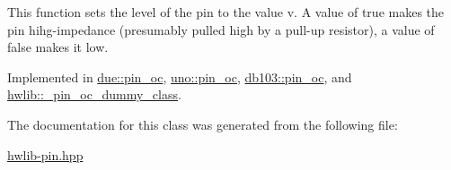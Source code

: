 This function sets the level of the pin to the value v. A value of true makes the pin hihg-\/impedance (presumably pulled high by a pull-\/up resistor), a value of false makes it low. 

Implemented in \hyperlink{classdue_1_1pin__oc_acfeab83375e9620804e87d695d3ea3b4}{due\+::pin\+\_\+oc}, \hyperlink{classuno_1_1pin__oc_a4f3191e577d13dab583d5fe86a9d960e}{uno\+::pin\+\_\+oc}, \hyperlink{classdb103_1_1pin__oc_afce9e329b087308a33ae30dbd701b08a}{db103\+::pin\+\_\+oc}, and \hyperlink{classhwlib_1_1__pin__oc__dummy__class_a10db7f81b4ed0dc0573f039d97c1d69e}{hwlib\+::\+\_\+pin\+\_\+oc\+\_\+dummy\+\_\+class}.



The documentation for this class was generated from the following file\+:\begin{DoxyCompactItemize}
\item 
\hyperlink{hwlib-pin_8hpp}{hwlib-\/pin.\+hpp}\end{DoxyCompactItemize}
